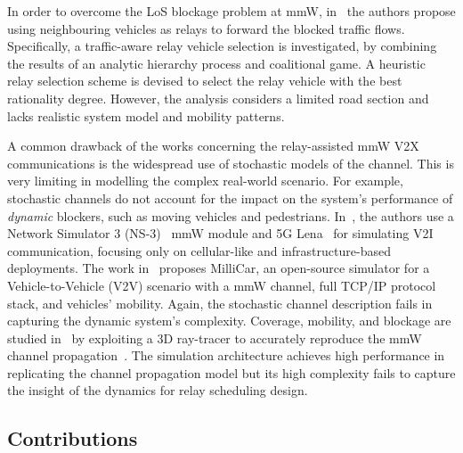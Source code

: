 \documentclass[journal]{IEEEtran}
\begin{document}
In order to overcome the LoS blockage problem at mmW, in~\cite{map2} the authors propose
using neighbouring vehicles as relays to forward the blocked traffic flows. Specifically, a traffic-aware relay vehicle selection is
investigated, by combining the results of an analytic hierarchy process and coalitional game. A heuristic relay selection scheme is devised to select the relay vehicle with the best rationality degree. However, the analysis considers a limited road section and lacks realistic system model and mobility patterns.

A common drawback of the works concerning the relay-assisted mmW V2X communications is the widespread use of stochastic models of the channel. This is very limiting in modelling the complex real-world scenario. For example, stochastic channels do not account for the impact on the system's performance of \textit{dynamic} blockers, such as moving vehicles and pedestrians.
In~\cite{mezzavilla2018end}, the authors use a Network Simulator 3 (NS-3)~\cite{ns3} mmW module and 5G Lena~\cite{patriciello2019e2e} for simulating V2I communication, focusing only on cellular-like and infrastructure-based deployments. The work in~\cite{drago2020millicar} proposes MilliCar, an open-source simulator for a Vehicle-to-Vehicle (V2V) scenario with a mmW channel, full TCP/IP protocol stack, and vehicles' mobility. Again, the stochastic channel description fails in capturing the dynamic system's complexity.  Coverage, mobility, and blockage are studied in~\cite{wang2020demystifying} by exploiting a 3D ray-tracer to accurately reproduce the mmW channel propagation~\cite{lubke2020channel}. The simulation architecture achieves high performance in replicating the channel propagation model but its high complexity fails to capture the insight of the dynamics for relay scheduling design.

\subsection*{Contributions}
\end{document}
